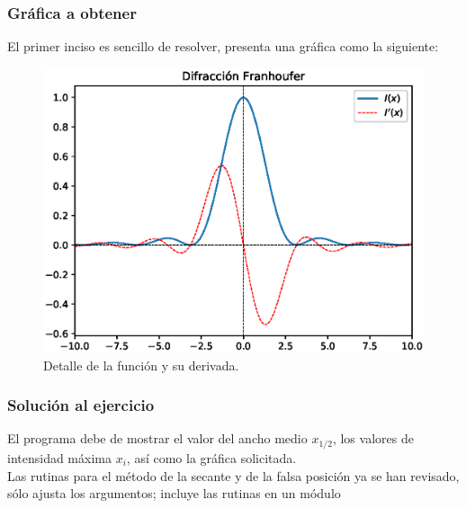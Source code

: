 \begin{frame}
\frametitle{Gráfica a obtener}
El primer inciso es sencillo de resolver, presenta una gráfica como la siguiente:
\begin{figure}[h!]
    \centering
    \includegraphics[scale=0.4]{Imagenes/raices_scipy_Franhoufer_01.eps}
    \caption{Detalle de la función y su derivada.}
\end{figure}
\end{frame}
\begin{frame}
\frametitle{Solución al ejercicio}
El programa debe de mostrar el valor del ancho medio $x_{1/2}$, los valores de intensidad máxima $x_{i}$, así como la gráfica solicitada.
\\
\bigskip
Las rutinas para el método de la secante y de la falsa posición ya se han revisado, sólo ajusta los argumentos; incluye las rutinas en un módulo 
\end{frame}
